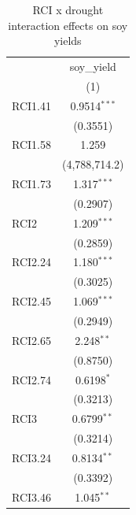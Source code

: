 
\begin{table}[H]
   \caption{\label{tab:soy_rci_vpd} RCI x drought interaction effects on soy yields}
   \bigskip
   \centering
   \begin{tabular}{lc}
      \toprule
                                            & soy\_yield\\   
                                            & (1)\\  
      \midrule 
      RCI1.41                               & 0.9514$^{***}$\\   
                                            & (0.3551)\\   
      RCI1.58                               & 1.259\\   
                                            & (4,788,714.2)\\   
      RCI1.73                               & 1.317$^{***}$\\   
                                            & (0.2907)\\   
      RCI2                                  & 1.209$^{***}$\\   
                                            & (0.2859)\\   
      RCI2.24                               & 1.180$^{***}$\\   
                                            & (0.3025)\\   
      RCI2.45                               & 1.069$^{***}$\\   
                                            & (0.2949)\\   
      RCI2.65                               & 2.248$^{**}$\\   
                                            & (0.8750)\\   
      RCI2.74                               & 0.6198$^{*}$\\   
                                            & (0.3213)\\   
      RCI3                                  & 0.6799$^{**}$\\   
                                            & (0.3214)\\   
      RCI3.24                               & 0.8134$^{**}$\\   
                                            & (0.3392)\\   
      RCI3.46                               & 1.045$^{**}$\\   

\end{tabular}
\end{table}
